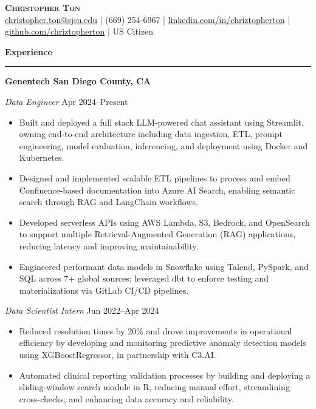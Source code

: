 \documentclass[letterpaper,10pt]{article}
\newcommand{\resumesection}[1]{
  \vspace{4pt}
  \noindent\textbf{\Large #1} \\
  \noindent\rule{\linewidth}{0.2pt}
  \vspace{-4pt}
}
\begin{document}
\begin{center}
    \textbf{\Huge \scshape Christopher Ton} \\
    \href{mailto:christopher.ton@sjsu.edu}{christopher.ton@sjsu.edu} | (669) 254-6967 | \href{https://linkedin.com/in/chriztopherton/}{linkedin.com/in/chriztopherton} | \href{https://github.com/chriztopherton}{github.com/chriztopherton} | US Citizen
\end{center}

\resumesection{Experience}

\textbf{Genentech \hfill San Diego County, CA}\par
\textit{Data Engineer} \hfill Apr 2024--Present
\begin{itemize}[leftmargin=0.15in, itemsep=0pt, parsep=0pt, topsep=0pt]
    \item Built and deployed a full stack LLM-powered chat assistant using Streamlit, owning end-to-end architecture including data ingestion, ETL, prompt engineering, model evaluation, inferencing, and deployment using Docker and Kubernetes.
    \item Designed and implemented scalable ETL pipelines to process and embed Confluence-based documentation into Azure AI Search, enabling semantic search through RAG and LangChain workflows.
    \item Developed serverless APIs using AWS Lambda, S3, Bedrock, and OpenSearch to support multiple Retrieval-Augmented Generation (RAG) applications, reducing latency and improving maintainability.
    \item Engineered performant data models in Snowflake using Talend, PySpark, and SQL across 7+ global sources; leveraged dbt to enforce testing and materializations via GitLab CI/CD pipelines.
\end{itemize}

\textit{Data Scientist Intern} \hfill Jun 2022--Apr 2024
\begin{itemize}[leftmargin=0.15in, itemsep=0pt, parsep=0pt, topsep=0pt]
    \item Reduced resolution times by 20\% and drove improvements in operational efficiency by developing and monitoring predictive anomaly detection models using XGBoostRegressor, in partnership with C3.AI.
    \item Automated clinical reporting validation processes by building and deploying a sliding-window search module in R, reducing manual effort, streamlining cross-checks, and enhancing data accuracy and reliability.
\end{itemize}
\end{document}
